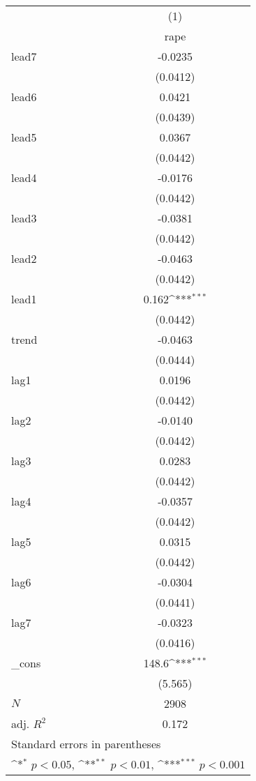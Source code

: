 {
\def\sym#1{\ifmmode^{#1}\else\(^{#1}\)\fi}
\begin{tabular}{l*{1}{c}}
\hline\hline
            &\multicolumn{1}{c}{(1)}\\
            &\multicolumn{1}{c}{rape}\\
\hline
lead7       &     -0.0235         \\
            &    (0.0412)         \\
[1em]
lead6       &      0.0421         \\
            &    (0.0439)         \\
[1em]
lead5       &      0.0367         \\
            &    (0.0442)         \\
[1em]
lead4       &     -0.0176         \\
            &    (0.0442)         \\
[1em]
lead3       &     -0.0381         \\
            &    (0.0442)         \\
[1em]
lead2       &     -0.0463         \\
            &    (0.0442)         \\
[1em]
lead1       &       0.162\sym{***}\\
            &    (0.0442)         \\
[1em]
trend       &     -0.0463         \\
            &    (0.0444)         \\
[1em]
lag1        &      0.0196         \\
            &    (0.0442)         \\
[1em]
lag2        &     -0.0140         \\
            &    (0.0442)         \\
[1em]
lag3        &      0.0283         \\
            &    (0.0442)         \\
[1em]
lag4        &     -0.0357         \\
            &    (0.0442)         \\
[1em]
lag5        &      0.0315         \\
            &    (0.0442)         \\
[1em]
lag6        &     -0.0304         \\
            &    (0.0441)         \\
[1em]
lag7        &     -0.0323         \\
            &    (0.0416)         \\
[1em]
\_cons      &       148.6\sym{***}\\
            &     (5.565)         \\
\hline
\(N\)       &        2908         \\
adj. \(R^{2}\)&       0.172         \\
\hline\hline
\multicolumn{2}{l}{\footnotesize Standard errors in parentheses}\\
\multicolumn{2}{l}{\footnotesize \sym{*} \(p<0.05\), \sym{**} \(p<0.01\), \sym{***} \(p<0.001\)}\\
\end{tabular}
}
